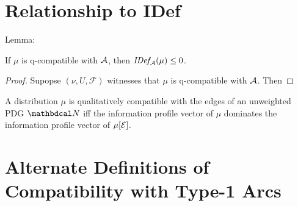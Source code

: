 \documentclass{article}
\begin{document}



\section{Relationship to IDef}


\begin{conj}
    Lemma: 
\end{conj}


\begin{conj}
    If $\mu$ is q-compatible with $\mathcal A$,
    then $\mathit{IDef}_{\!\mathcal A}(\mu) \le 0$.
\end{conj}

\begin{proof}
    Supopse $(\nu, U, \mathcal F)$ witnesses that $\mu$ is q-compatible with $\mathcal A$.  Then 
\end{proof}




\begin{conj}
    A distribution $\mu$ is qualitatively compatible with the edges of an unweighted PDG $\dg N$ iff
    the information profile vector of $\mu$ dominates the information profile vector of $\mu[\mathcal E]$.
\end{conj}


\appendix
\clearpage
\section{Alternate Definitions of Compatibility with Type-1 Arcs}
\end{document}
